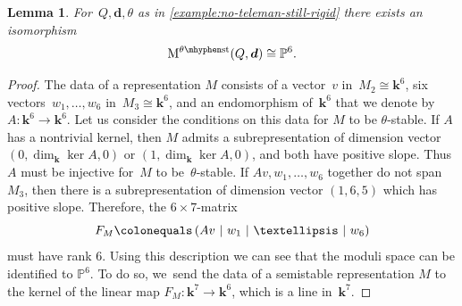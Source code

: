 \documentclass[11pt]{article}
\theoremstyle{plain}
\newtheorem{lemma}[theorem]{Lemma}
\theoremstyle{definition}
\newcommand\field{\mathbf{k}}
\newcommand\stable{\ensuremath{\mhyphen\mathrm{st}}}
\newcommand\tuple[1]{\ensuremath{{\boldsymbol{#1}}}}
\newif\ifcode
\begin{document}
\begin{lemma}
\label{lemma:P6}
For~$Q,\tuple{d},\theta$ as in \cref{example:no-teleman-still-rigid}
there exists an isomorphism
\begin{equation*}
\modulispace[\theta\stable]{Q,\tuple{d}}\cong\mathbb{P}^6.
\end{equation*}
\end{lemma}

\begin{proof}
The data of a representation $M$ consists of
a vector~$v$ in~$M_2\cong\field^6$,
six vectors~$w_1,\dots,w_6$ in~$M_3\cong\field^6$,
and an endomorphism of~$\field^6$ that we denote by~\hbox{$A \colon \field^6 \!\to\! \field^6$}.
Let us consider the conditions on this data for $M$ to be $\theta$-stable.
If $A$ has a nontrivial kernel, then $M$ admits a subrepresentation of dimension vector $(0,\dim_\field\ker A,0)$ or $(1,\dim_\field\ker A,0)$,
and both have positive slope.
Thus $A$ must be injective for~$M$ to be~$\theta$-stable.
If $Av,w_1,\dots,w_6$ together do not span $M_3$,
then there is a subrepresentation of dimension vector $(1,6,5)$ which has positive slope.
Therefore, the $6 \times 7$-matrix
\begin{equation*}
F_{M} \colonequals\left( Av~|~w_1~|~\dots~|~w_6 \right)
\end{equation*}
must have rank $6$.
Using this description we can see that
the moduli space can be identified to $\mathbb{P}^6$.
To do so, we~send the data of a semistable representation $M$ to
the kernel of the linear map $F_M \colon \field^7 \to \field^6$,
which is a line in~$\field^7$.
\end{proof}
\ifcode
Corresponding Sage code below. Version of quiver.tools: commit a07f4f0

\begin{verbatim}
sage: from quiver import *
sage: Q = ThreeVertexQuiver(1,6,1)
sage: d = vector([1,6,6])
sage: theta = Q.canonical_stability_parameter(d)
sage: theta
(42, 5, -12)
sage: is_coprime_for_stability_parameter(d,theta)
True
sage: Q.has_semistable_representation(d,theta)
True
sage: len(Q.all_harder_narasimhan_types(d,theta))
85
sage: hntype = [vector([0,1,0]),vector([1,5,6])]
sage: hntype in Q.all_harder_narasimhan_types(d,theta)
True
sage: Q.codimension_of_harder_narasimhan_stratum(hntype)
1
sage: k1 = slope(hntype[0],theta)
sage: k2 = slope(hntype[1],theta)
sage: print(k1,k2)
5 -5/12
sage: Q.euler_form(hntype[0],hntype[1])
-1
\end{verbatim}
\fi
\end{document}
